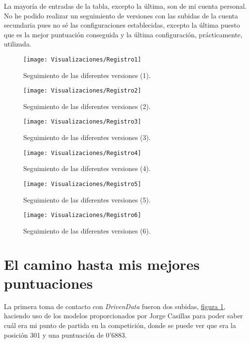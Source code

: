 \documentclass[paper=a4, fontsize=12pt]{article} %
\numberwithin{equation}{section} %
\numberwithin{figure}{section} %
\numberwithin{table}{section} %
\begin{document}
La mayoría de entradas de la tabla, excepto la última, son de mi cuenta personal. No he podido realizar un seguimiento de versiones con las subidas de la cuenta secundaria pues no sé las configuraciones establecidas, excepto la última puesto que es la mejor puntuación conseguida y la última configuración, prácticamente, utilizada.

\begin{figure}[H]
  \centering
  \texttt{[image: Visualizaciones/Registro1]}
  \caption{Seguimiento de las diferentes versiones (1).}
  \label{registro1}
\end{figure}

\begin{figure}[H]
  \centering
  \texttt{[image: Visualizaciones/Registro2]}
  \caption{Seguimiento de las diferentes versiones (2).}
  \label{registro2}
\end{figure}

\begin{figure}[H]
  \centering
  \texttt{[image: Visualizaciones/Registro3]}
  \caption{Seguimiento de las diferentes versiones (3).}
  \label{registro3}
\end{figure}

\begin{figure}[H]
  \centering
  \texttt{[image: Visualizaciones/Registro4]}
  \caption{Seguimiento de las diferentes versiones (4).}
  \label{registro4}
\end{figure}

\begin{figure}[H]
  \centering
  \texttt{[image: Visualizaciones/Registro5]}
  \caption{Seguimiento de las diferentes versiones (5).}
  \label{registro5}
\end{figure}

\begin{figure}[H]
  \centering
  \texttt{[image: Visualizaciones/Registro6]}
  \caption{Seguimiento de las diferentes versiones (6).}
  \label{registro6}
\end{figure}

\section {El camino hasta mis mejores puntuaciones}

La primera toma de contacto con \textit{DrivenData} fueron dos subidas, \hyperref[registro1]{figura \ref*{registro1}}, haciendo uso de los modelos proporcionados por Jorge Casillas para poder saber cuál era mi punto de partida en la competición, donde se puede ver que era la posición 301 y una puntuación de $0'6883$. \\
\end{document}
